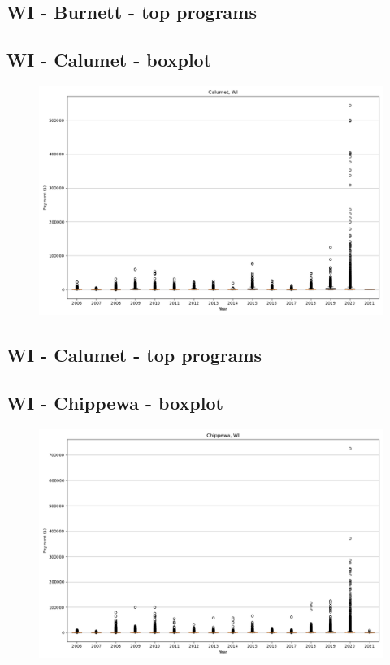 \subsection*{WI - Burnett - top programs}

\newpage
\subsection*{WI - Calumet - boxplot}
\begin{figure}[h]
\centering
\includegraphics[width=7in]{../output/boxplots/counties/Calumet-WI_boxplot.png}
\end{figure}


\subsection*{WI - Calumet - top programs}

\newpage
\subsection*{WI - Chippewa - boxplot}
\begin{figure}[h]
\centering
\includegraphics[width=7in]{../output/boxplots/counties/Chippewa-WI_boxplot.png}
\end{figure}


